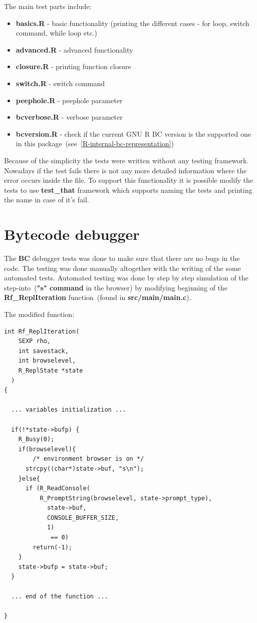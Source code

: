 \documentclass[thesis=M,english]{FITthesis}[2018/10/20]
\begin{document}
The main test parts include:
\begin{itemize}
	\item \textbf{basics.R} - basic functionality (printing the different cases - for loop, switch command, while loop etc.)
	\item \textbf{advanced.R} - advanced functionality
	\item \textbf{closure.R} - printing function closure
	\item \textbf{switch.R} - switch command
	\item \textbf{peephole.R} - peephole parameter
	\item \textbf{bcverbose.R} - verbose parameter
	\item \textbf{bcversion.R} - check if the current GNU R BC version is the supported one in this package~(see~\ref{R-internal-bc-representation})
\end{itemize}

Because of the simplicity the tests were written without any testing framework. Nowadays if the test fails there is not any more detailed information where the error occurs inside the file. To support this functionality it is possible modify the tests to use \textbf{test{\_}that} framework which supports naming the tests and printing the name in case of it's fail. 

\section{Bytecode debugger}

The \textbf{BC} debugger tests was done to make sure that there are no bugs in the code. The testing was done manually altogether with the writing of the some automated tests. Automated testing was done by step by step simulation of the step-into~(\textbf{"s" command} in the browser) by modifying beginning of the \textbf{Rf{\_}ReplIteration} function~(found in \textbf{src/main/main.c}). 

The modified function:
\begin{lstlisting}
int Rf_ReplIteration(
	SEXP rho, 
	int savestack, 
	int browselevel, 
	R_ReplState *state
  )
{

  ... variables initialization ...

  if(!*state->bufp) {
    R_Busy(0);
    if(browselevel){	
    	/* environment browser is on */
      strcpy((char*)state->buf, "s\n");
    }else{
      if (R_ReadConsole(
      	  R_PromptString(browselevel, state->prompt_type),
            state->buf, 
            CONSOLE_BUFFER_SIZE, 
            1)
             == 0)
        return(-1);
    }
    state->bufp = state->buf;
  }

  ... end of the function ...

}
\end{lstlisting}
\end{document}
